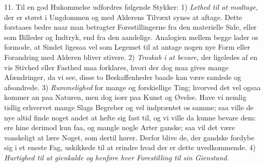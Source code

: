 \documentclass[12pt,a4paper]{article}
\begin{document}
11. Til en god Hukommelse udfordres følgende Stykker: 1) \emph{Lethed til at modtage,}
der er størst i Ungdommen og med Alderens Tilvæxt synes at aftage. Dette forstaaes bedre
naar man betragter Forestillingerne fra den materielle Side, eller som Billeder og
Indtryk, end fra den aandelige. Analogien mellem begge lader os formode, at Sindet
ligesaa vel som Legemet til at antage nogen nye Form eller Forandring med Alderen bliver
stivere. 2) \emph{Troskab i at bevare,} der ligeledes af en vis Stivhed eller Fasthed maa
forklares, hvori der dog maa gives mange Afændringer, da vi see, disse to Beskaffenheder
baade kan være samlede og afsondrede. 3) \emph{Rummelighed} for mange og forskiellige
Ting; hvorved det vel ogsaa kommer an paa Naturen, men dog især paa Kunst og Øvelse. Have
vi nemlig tidlig erhvervet mange Slags Begreber og vel indpræntet os samme; saa ville de
nye altid finde noget andet at hefte sig fast til, og vi ville da kunne bevare dem: ere
hine derimod kun faa, og mangle nogle Arter ganske; saa vil det være vanskeligt at lære
Noget, som dertil hører. Derfor blive de, der gandske fordybe sig i et eneste Fag,
uskikkede til at erindre hvad der er dette uvedkommende. 4) \emph{Hurtighed til at
gienkalde og henføre hver Forestilling til sin Gienstand.}
\end{document}
